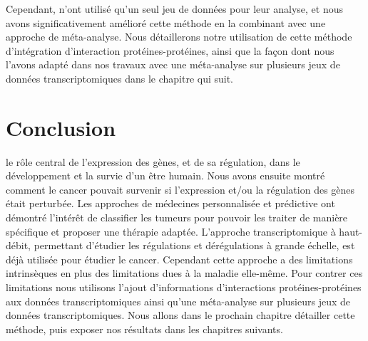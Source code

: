 			Cependant, \citeauthor{Chuang2007} n'ont utilisé qu'un seul jeu de données pour leur analyse, et nous avons significativement amélioré cette méthode en la combinant avec une approche de méta-analyse.
			Nous détaillerons notre utilisation de cette méthode d'intégration d'interaction protéines-protéines, ainsi que la façon dont nous l'avons adapté dans nos travaux avec une méta-analyse sur plusieurs jeux de données transcriptomiques dans le chapitre qui suit.

	\section{\textcolor{red!45!black}{Conclusion}}

		 le rôle central de l'expression des gènes, et de sa régulation, dans le développement et la survie d'un être humain.
		Nous avons ensuite montré comment le cancer pouvait survenir si l'expression et/ou la régulation des gènes était perturbée.
		Les approches de médecines personnalisée et prédictive ont démontré l'intérêt de classifier les tumeurs pour pouvoir les traiter de manière spécifique et proposer une thérapie adaptée.
		L'approche transcriptomique à haut-débit, permettant d'étudier les régulations et dérégulations à grande échelle, est déjà utilisée pour étudier le cancer.
		Cependant cette approche a des limitations intrinsèques en plus des limitations dues à la maladie elle-même.
		Pour contrer ces limitations nous utilisons l'ajout d'informations d'interactions protéines-protéines aux données transcriptomiques ainsi qu'une méta-analyse sur plusieurs jeux de données transcriptomiques.
		Nous allons dans le prochain chapitre détailler cette méthode, puis exposer nos résultats dans les chapitres suivants.
